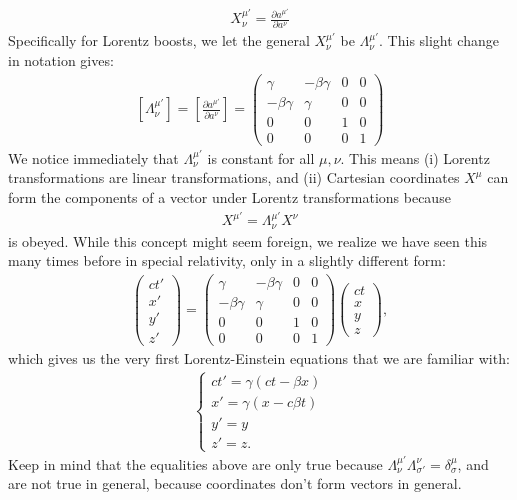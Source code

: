 \documentclass{book}
\theoremstyle{definition}
\newcommand{\x}{\xi}
\begin{document}
\begin{align*}
\boxed{X^{\mu'}_\nu = \frac{\partial a^{\mu'}}{\partial a^\nu}}
\end{align*}
Specifically for Lorentz boosts, we let the general $X^{\mu'}_\nu$ be $\Lambda^{\mu'}_\nu$. This slight change in notation gives:
\begin{align*}
\boxed{[\Lambda^{\mu'}_\nu] = \left[ \frac{\partial a^{\mu'}}{\partial a^{\nu}}\right] = 
\begin{pmatrix}
\gamma & -\beta\gamma & 0 & 0\\
-\beta\gamma & \gamma & 0 & 0\\
0 & 0 & 1 & 0\\
0 & 0 & 0 & 1
\end{pmatrix}}
\end{align*}
We notice immediately that $\Lambda^{\mu'}_\nu$ is constant for all $\mu, \nu$. This means (i) Lorentz transformations are linear transformations, and (ii) Cartesian coordinates $X^{\mu}$ can form the components of a vector under Lorentz transformations because
\begin{align*}
X^{\mu'} = \Lambda^{\mu'}_\nu X^{\nu}
\end{align*} 
is obeyed. While this concept might seem foreign, we realize we have seen this many times before in special relativity, only in a slightly different form:
\begin{align*}
\begin{pmatrix}
ct'\\x'\\y'\\z'
\end{pmatrix}
=
\begin{pmatrix}
\gamma & -\beta\gamma & 0 & 0\\
-\beta\gamma & \gamma & 0 & 0\\
0 & 0 & 1 & 0\\
0 & 0 & 0 & 1
\end{pmatrix}
\begin{pmatrix}
ct\\x\\y\\z
\end{pmatrix},
\end{align*}
which gives us the very first Lorentz-Einstein equations that we are familiar with:
\begin{align*}
\begin{cases}
ct'= \gamma(ct-\beta x)\\
x'= \gamma(x - c\beta t)\\
y'= y\\
z'= z.
\end{cases}
\end{align*}
Keep in mind that the equalities above are only true because $\Lambda^{\mu'}_\nu \Lambda^{\nu}_{\sigma'} = \delta^\mu_\sigma$, and are not true in general, because coordinates don't form vectors in general.\\
\end{document}
